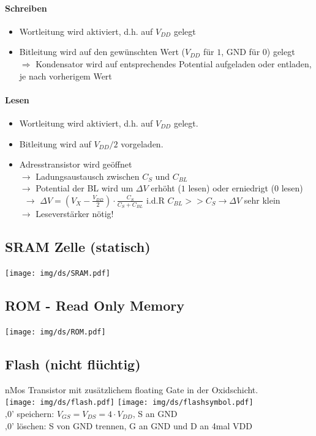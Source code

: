 \documentclass[6pt,a4paper]{scrartcl}
\newcommand{\Ra}[0]{\ensuremath{\Rightarrow}}									%
\newcommand{\ra}[0]{\ensuremath{\rightarrow}} 									%
\begin{document}
\begin{multicols}{3}
{	\paragraph{Schreiben}
		\begin{itemize}\itemsep0pt
			\item Wortleitung wird aktiviert, d.h. auf $V_{DD}$ gelegt
			\item Bitleitung wird auf den gewünschten Wert ($V_{DD}$ für $1$, GND für $0$) gelegt \\
			$\Ra$ Kondensator wird auf entsprechendes Potential aufgeladen oder entladen, je nach vorherigem Wert
		\end{itemize}
	}
	
	\paragraph{Lesen}
	\begin{itemize}\itemsep0pt
		\item Wortleitung wird aktiviert, d.h. auf $V_{DD}$ gelegt. 
		\item Bitleitung wird auf $V_{DD} / 2$ vorgeladen.
		\item Adresstransistor wird geöffnet \\
		$\ra$ Ladungsaustausch zwischen $C_S$ und $C_{BL}$ \\
		$\ra$ Potential der BL wird um $\Delta V$ erhöht ($1$ lesen) oder erniedrigt ($0$ lesen) \\\
		$\ra$ $\Delta V = \left(V_X - \frac{V_{DD}}{2}\right) \cdot \frac{C_S}{C_S + C_{BL}}$ \quad i.d.R $C_{BL} >> C_S \ra \Delta V$ sehr klein \\
		$\ra $ Leseverstärker nötig!
	\end{itemize}

\begin{multicols}{2}	
	\subsection{SRAM Zelle (statisch)}
	\texttt{[image: img/ds/SRAM.pdf]}


	\subsection{ROM - Read Only Memory}
	\texttt{[image: img/ds/ROM.pdf]}
\end{multicols}

	\subsection{Flash (nicht flüchtig)}
	nMos Transistor mit zusätzlichem floating Gate in der Oxidschicht.\\
	\texttt{[image: img/ds/flash.pdf]} \qquad \texttt{[image: img/ds/flashsymbol.pdf]}\\
	‚0’ speichern: $V_{GS} = V_{DS} = 4 \cdot V_{DD}$, S an GND\\
	‚0’ löschen: S von GND trennen, G an GND und D an 4mal VDD\\
 


\end{multicols}
\end{document}
